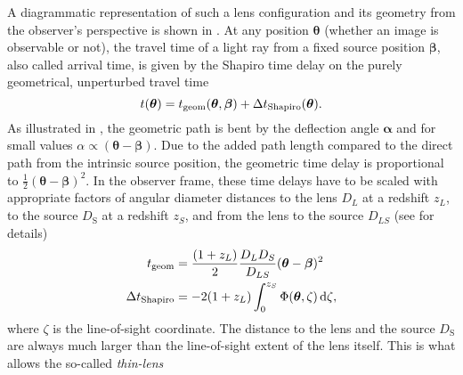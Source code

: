 A diagrammatic representation of such a lens configuration and its geometry from
the observer's perspective is shown in .  At any position
$\bm\theta$ (whether an image is observable or not), the travel time of a light
ray from a fixed source position $\bm\beta$, also called arrival time, is given
by the Shapiro time delay on the purely geometrical, unperturbed travel time
%
\begin{equation}\eqlbl{delay_components}%
  t(\bm\theta) = t_{\text{geom}}(\bm\theta, \bm\beta)
  + \Delta t_{\text{Shapiro}}(\bm\theta).
\end{equation}%
%
As illustrated in , the geometric path is bent by the
deflection angle $\bm\alpha$ and for small values $\alpha\propto(\bm\theta -
\bm\beta)$. Due to the added path length compared to the direct path from the
intrinsic source position, the geometric time delay is proportional to
$\frac{1}{2}(\bm\theta - \bm\beta)^{2}$.  In the observer frame, these time
delays have to be scaled with appropriate factors of angular diameter distances
to the lens $D_{L}$ at a redshift $z_{L}$, to the source $D_\mathrm{S}$ at a
redshift $z_{S}$, and from the lens to the source $D_{LS}$ (see
 for details)
%
%
\begin{equation}\eqlbl{geo_and_shapiro}%
  \begin{aligned}%
    t_{\text{geom}} &= \frac{(1+z_{L})}{2}\frac{D_{L}D_{S}}{D_{LS}}(\bm\theta - \bm\beta)^{2} \\
    \Delta t_{\text{Shapiro}} &= -2(1+z_{L})\int_{0}^{z_{S}}\Phi(\bm\theta, \zeta)\,\mathrm{d}\zeta,
  \end{aligned}%
\end{equation}%
%
where $\zeta$ is the line-of-sight coordinate.  The distance to the lens and the
source $D_\mathrm{S}$ are always much larger than the line-of-sight extent of
the lens itself. This is what allows the so-called \textit{thin-lens}
